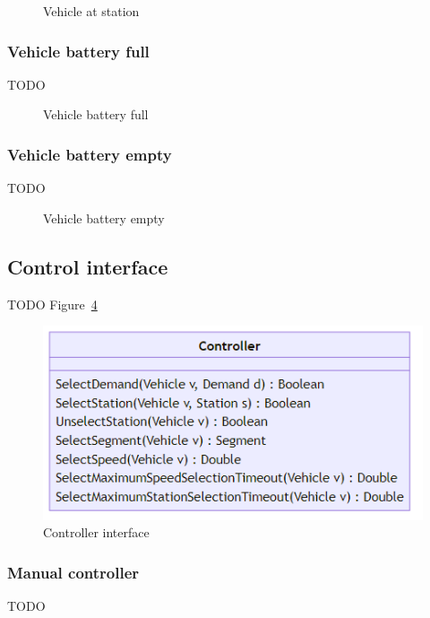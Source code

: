 \documentclass[graybox]{svmult}
\begin{document}
\begin{figure}[htbp]
	\centering
	\caption{Vehicle at station}
	\label{fig:vehicle-at-station}
\end{figure}

\subsubsection{Vehicle battery full}
TODO

\begin{figure}[htbp]
	\centering
	\caption{Vehicle battery full}
	\label{fig:vehicle-battery-full}
\end{figure}

\subsubsection{Vehicle battery empty}
TODO

\begin{figure}[htbp]
	\centering
	\caption{Vehicle battery empty}
	\label{fig:vehicle-battery-empty}
\end{figure}

\subsection{Control interface}
\label{sec:controller}
TODO Figure~\ref{fig:controller}

\begin{figure}[t]
	\centering
	\includegraphics[scale=0.4]{../../diagrams/controller/classes-minimal.png}
	\caption{Controller interface}
	\label{fig:controller}
\end{figure}

\subsubsection{Manual controller}
TODO
\end{document}
